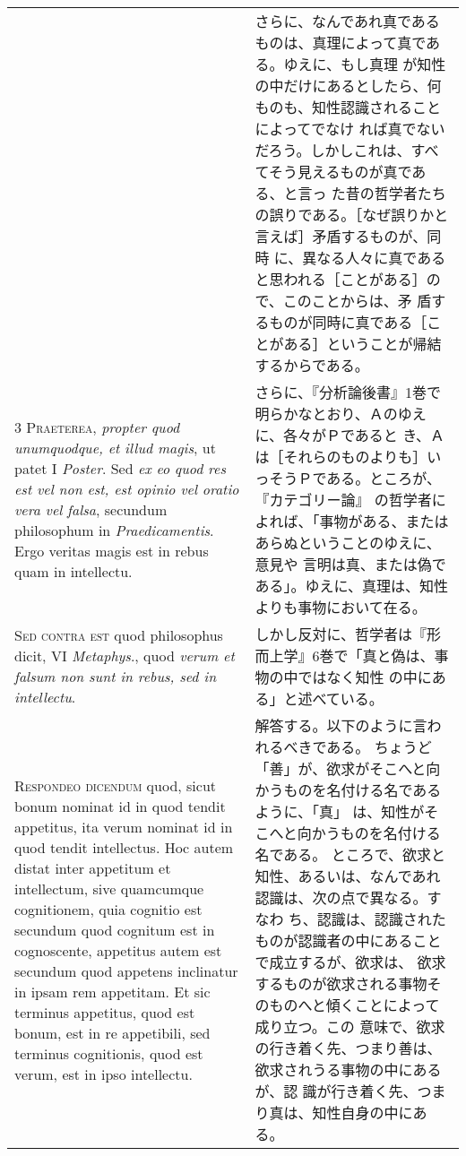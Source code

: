 \documentclass[10pt]{jsarticle} %
\begin{document}
\begin{longtable}{p{21em}p{21em}}
&

さらに、なんであれ真であるものは、真理によって真である。ゆえに、もし真理
 が知性の中だけにあるとしたら、何ものも、知性認識されることによってでなけ
 れば真でないだろう。しかしこれは、すべてそう見えるものが真である、と言っ
 た昔の哲学者たちの誤りである。［なぜ誤りかと言えば］矛盾するものが、同時
 に、異なる人々に真であると思われる［ことがある］ので、このことからは、矛
 盾するものが同時に真である［ことがある］ということが帰結するからである。

\\


{\scshape 3 Praeterea}, {\itshape propter quod unumquodque, et illud
magis}, ut patet I {\itshape Poster}. Sed {\itshape ex eo quod res est
vel non est, est opinio vel oratio vera vel falsa}, secundum philosophum
in {\itshape Praedicamentis}. Ergo veritas magis est in rebus quam in
intellectu.


&

さらに、『分析論後書』1巻で明らかなとおり、Ａのゆえに、各々がＰであると
き、Ａは［それらのものよりも］いっそうＰである。ところが、『カテゴリー論』
 の哲学者によれば、「事物がある、またはあらぬということのゆえに、意見や
 言明は真、または偽である」。ゆえに、真理は、知性よりも事物において在る。

\\


{\scshape Sed contra est} quod philosophus dicit, VI {\itshape
Metaphys}., quod {\itshape verum et falsum non sunt in rebus, sed in
intellectu}.


&
しかし反対に、哲学者は『形而上学』6巻で「真と偽は、事物の中ではなく知性
 の中にある」と述べている。


\\


{\scshape Respondeo dicendum} quod, sicut bonum nominat
id in quod tendit appetitus, ita verum nominat id in quod tendit
intellectus. Hoc autem distat inter appetitum et intellectum, sive
quamcumque cognitionem, quia cognitio est secundum quod cognitum est in
cognoscente, appetitus autem est secundum quod appetens inclinatur in
ipsam rem appetitam. Et sic terminus appetitus, quod est bonum, est in
re appetibili, sed terminus cognitionis, quod est verum, est in ipso
intellectu. 


&

解答する。以下のように言われるべきである。
ちょうど「善」が、欲求がそこへと向かうものを名付ける名であるように、「真」
は、知性がそこへと向かうものを名付ける名である。
ところで、欲求と知性、あるいは、なんであれ認識は、次の点で異なる。すなわ
 ち、認識は、認識されたものが認識者の中にあることで成立するが、欲求は、
 欲求するものが欲求される事物そのものへと傾くことによって成り立つ。この
 意味で、欲求の行き着く先、つまり善は、欲求されうる事物の中にあるが、認
 識が行き着く先、つまり真は、知性自身の中にある。


\end{longtable}
\end{document}
